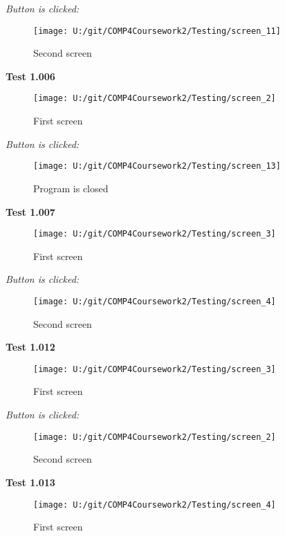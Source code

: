 \textit{Button is clicked: }

\begin{figure}[H]
    \label{fig: Second Screen}\caption{Second screen}
    \texttt{[image: U:/git/COMP4Coursework2/Testing/screen\_11]}
\end{figure}

\textbf{Test 1.006}

\begin{figure}[H]
    \label{fig: First Screen}\caption{First screen}
    \texttt{[image: U:/git/COMP4Coursework2/Testing/screen\_2]}
\end{figure}

\textit{Button is clicked: }

\begin{figure}[H]
    \label{fig: Second Screen}\caption{Program is closed}
    \texttt{[image: U:/git/COMP4Coursework2/Testing/screen\_13]}
\end{figure}

\textbf{Test 1.007}

\begin{figure}[H]
    \label{fig: First Screen}\caption{First screen}
    \texttt{[image: U:/git/COMP4Coursework2/Testing/screen\_3]}
\end{figure}

\textit{Button is clicked: }

\begin{figure}[H]
    \label{fig: Second Screen}\caption{Second screen}
    \texttt{[image: U:/git/COMP4Coursework2/Testing/screen\_4]}
\end{figure}

\textbf{Test 1.012}

\begin{figure}[H]
    \label{fig: First Screen}\caption{First screen}
    \texttt{[image: U:/git/COMP4Coursework2/Testing/screen\_3]}
\end{figure}

\textit{Button is clicked: }

\begin{figure}[H]
    \label{fig: Second Screen}\caption{Second screen}
    \texttt{[image: U:/git/COMP4Coursework2/Testing/screen\_2]}
\end{figure}

\textbf{Test 1.013}

\begin{figure}[H]
    \label{fig: First Screen}\caption{First screen}
    \texttt{[image: U:/git/COMP4Coursework2/Testing/screen\_4]}
\end{figure}


